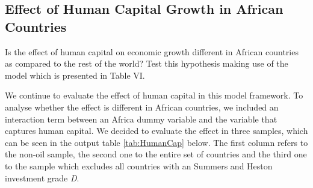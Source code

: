 \documentclass[a4paper,11pt]{article}
\begin{document}
\pagebreak

\begin{qbox}{\subsection{Effect of Human Capital Growth in African Countries}}
Is the effect of human capital on economic growth different in African countries as compared to the rest of the world? Test this hypothesis making use of the model which is presented in Table VI.
\end{qbox}

We continue to evaluate the effect of human capital in this model framework. To analyse whether the effect is different in African countries, we included an interaction term between an Africa dummy variable and the variable that captures human capital. We decided to evaluate the effect in three samples, which can be seen in the output table \ref{tab:HumanCap} below. The first column refers to the non-oil sample, the second one to the entire set of countries and the third one to the sample which excludes all countries with an Summers and Heston investment grade \textit{D}. 
\end{document}
